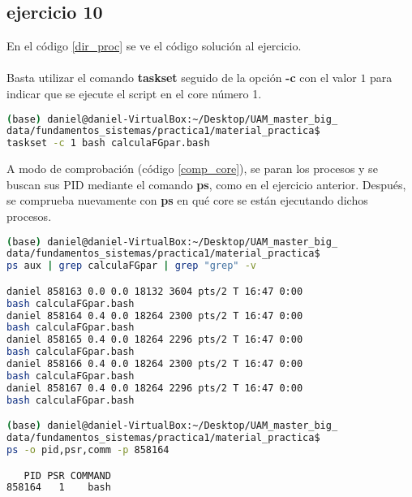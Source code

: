 \subsection*{ejercicio 10}
%
En el código \ref{dir_proc} se ve el código solución al ejercicio.\\\\
Basta utilizar el comando \textbf{taskset} seguido de la opción \textbf{-c} con el valor $1$ para indicar que se ejecute el script en el core número 1.
\begin{lstlisting}[language=bash,caption={Ejecución del script \textit{calculaFGpar.bash} en el core 1}, label={dir_proc}]
(base) daniel@daniel-VirtualBox:~/Desktop/UAM_master_big_
data/fundamentos_sistemas/practica1/material_practica$ 
taskset -c 1 bash calculaFGpar.bash
\end{lstlisting}
A modo de comprobación (código \ref{comp_core}), se paran los procesos y se buscan sus PID mediante el comando \textbf{ps}, como en el ejercicio anterior. Después, se comprueba nuevamente con \textbf{ps} en qué core se están ejecutando dichos procesos.
\begin{lstlisting}[language=bash,caption={Comprobación de la ejecución de \textit{calculaFGpar.bash}}, label={comp_core}]
(base) daniel@daniel-VirtualBox:~/Desktop/UAM_master_big_
data/fundamentos_sistemas/practica1/material_practica$
ps aux | grep calculaFGpar | grep "grep" -v

daniel 858163 0.0 0.0 18132 3604 pts/2 T 16:47 0:00 
bash calculaFGpar.bash
daniel 858164 0.4 0.0 18264 2300 pts/2 T 16:47 0:00 
bash calculaFGpar.bash
daniel 858165 0.4 0.0 18264 2296 pts/2 T 16:47 0:00 
bash calculaFGpar.bash
daniel 858166 0.4 0.0 18264 2300 pts/2 T 16:47 0:00 
bash calculaFGpar.bash
daniel 858167 0.4 0.0 18264 2296 pts/2 T 16:47 0:00 
bash calculaFGpar.bash

(base) daniel@daniel-VirtualBox:~/Desktop/UAM_master_big_
data/fundamentos_sistemas/practica1/material_practica$ 
ps -o pid,psr,comm -p 858164

   PID PSR COMMAND
858164   1    bash

\end{lstlisting}
